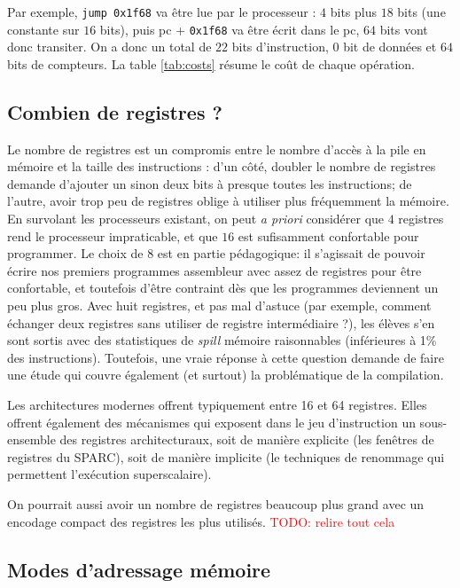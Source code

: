 \documentclass[architecture]{compas2018}
\newcommand{\todo}[1]{\textcolor{red}{TODO: #1}}
\begin{document}
Par exemple, \texttt{jump 0x1f68} va être lue par le processeur : $4$ bits plus $18$ bits (une constante sur $16$ bits), puis pc + \texttt{0x1f68} va être écrit dans le pc, $64$ bits vont donc transiter. On a donc un total de $22$ bits d'instruction, $0$ bit de données et $64$ bits de compteurs.
La table \ref{tab:costs} résume le coût de chaque opération.

\subsection{Combien de registres ?}
Le nombre de registres est un compromis entre le nombre d'accès à la pile en mémoire et la taille des instructions :
d'un côté, doubler le nombre de registres demande d'ajouter un sinon deux bits à presque toutes les instructions;
de l'autre, avoir trop peu de registres oblige à utiliser plus fréquemment la mémoire.
En survolant les processeurs existant, on peut {\it a priori} considérer que $4$ registres rend le processeur impraticable, et que $16$ est sufisamment confortable pour programmer.
Le choix de 8 est en partie pédagogique: il s'agissait de pouvoir écrire nos premiers programmes assembleur avec assez de registres pour être confortable, et toutefois d'être contraint dès que les programmes deviennent un peu plus gros. 
Avec huit registres, et pas mal d'astuce (par exemple, comment échanger deux registres sans utiliser de registre intermédiaire ?), les élèves s'en sont sortis avec des statistiques de \emph{spill} mémoire raisonnables (inférieures à 1\% des instructions).
Toutefois, une vraie réponse à cette question demande de faire une étude qui couvre également (et surtout) la problématique de la compilation.

Les architectures modernes offrent typiquement entre 16 et 64 registres.
Elles offrent également des mécanismes qui exposent dans le jeu d'instruction un sous-ensemble des registres architecturaux, soit de manière explicite (les fenêtres de registres du SPARC), soit de manière implicite (le techniques de renommage qui permettent l'exécution superscalaire).

On pourrait aussi avoir un nombre de registres beaucoup plus grand avec un encodage compact des registres les plus utilisés.
\todo{relire tout cela}

\subsection{Modes d'adressage mémoire}
\end{document}
